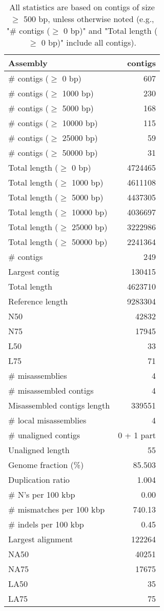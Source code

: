 \documentclass[12pt,a4paper]{article}
\begin{document}
\begin{table}[ht]
\begin{center}
\caption{All statistics are based on contigs of size $\geq$ 500 bp, unless otherwise noted (e.g., "\# contigs ($\geq$ 0 bp)" and "Total length ($\geq$ 0 bp)" include all contigs).}
\begin{tabular}{|l*{1}{|r}|}
\hline
Assembly & contigs \\ \hline
\# contigs ($\geq$ 0 bp) & 607 \\ \hline
\# contigs ($\geq$ 1000 bp) & 230 \\ \hline
\# contigs ($\geq$ 5000 bp) & 168 \\ \hline
\# contigs ($\geq$ 10000 bp) & 115 \\ \hline
\# contigs ($\geq$ 25000 bp) & 59 \\ \hline
\# contigs ($\geq$ 50000 bp) & 31 \\ \hline
Total length ($\geq$ 0 bp) & 4724465 \\ \hline
Total length ($\geq$ 1000 bp) & 4611108 \\ \hline
Total length ($\geq$ 5000 bp) & 4437305 \\ \hline
Total length ($\geq$ 10000 bp) & 4036697 \\ \hline
Total length ($\geq$ 25000 bp) & 3222986 \\ \hline
Total length ($\geq$ 50000 bp) & 2241364 \\ \hline
\# contigs & 249 \\ \hline
Largest contig & 130415 \\ \hline
Total length & 4623710 \\ \hline
Reference length & 9283304 \\ \hline
N50 & 42832 \\ \hline
N75 & 17945 \\ \hline
L50 & 33 \\ \hline
L75 & 71 \\ \hline
\# misassemblies & 4 \\ \hline
\# misassembled contigs & 4 \\ \hline
Misassembled contigs length & 339551 \\ \hline
\# local misassemblies & 4 \\ \hline
\# unaligned contigs & 0 + 1 part \\ \hline
Unaligned length & 55 \\ \hline
Genome fraction (\%) & 85.503 \\ \hline
Duplication ratio & 1.004 \\ \hline
\# N's per 100 kbp & 0.00 \\ \hline
\# mismatches per 100 kbp & 740.13 \\ \hline
\# indels per 100 kbp & 0.45 \\ \hline
Largest alignment & 122264 \\ \hline
NA50 & 40251 \\ \hline
NA75 & 17675 \\ \hline
LA50 & 35 \\ \hline
LA75 & 75 \\ \hline
\end{tabular}
\end{center}
\end{table}
\end{document}
